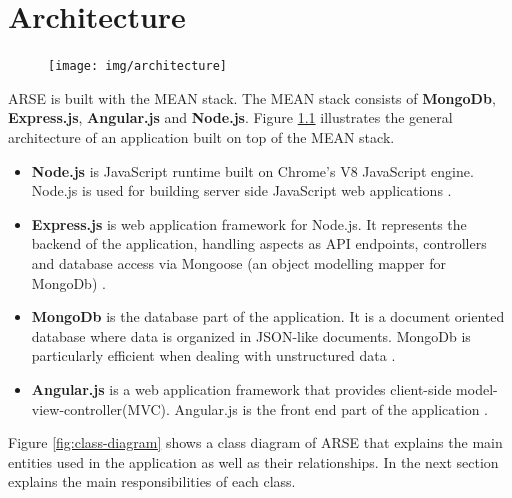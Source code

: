 \documentclass[
	accentcolor=tud1a %
]{tudreport}
\begin{document}
\chapter{Architecture}
\label{ch:architecture}

\begin{figure}
  \centering
    \texttt{[image: img/architecture]}
    \label{fig:architecture}
\end{figure}
ARSE is built with the MEAN stack. The MEAN stack consists of \textbf{MongoDb}, \textbf{Express.js}, \textbf{Angular.js} and \textbf{Node.js}. Figure \ref{fig:architecture} illustrates the general architecture of an application built on top of the MEAN stack.

\begin{itemize}
\item \textbf{Node.js} is JavaScript runtime built on Chrome's V8 JavaScript engine. Node.js is used for building server side JavaScript web applications \cite{NJS}.
\item \textbf{Express.js} is web application framework for Node.js. It represents the backend of the application, handling aspects as API endpoints, controllers and database access via Mongoose (an object modelling mapper for MongoDb) \cite{EXJS}.
\item \textbf{MongoDb} is the database part of the application. It is a document oriented database where data is organized in JSON-like documents. MongoDb is particularly efficient when dealing with unstructured data \cite{MDB}.
\item \textbf{Angular.js} is a web application framework that provides client-side model-view-controller(MVC). Angular.js is the front end part of the application \cite{AJS}.

\end{itemize}

Figure \ref{fig:class-diagram} shows a class diagram of ARSE that explains the main entities used in the application as well as their relationships. In the next section explains the main responsibilities of each class. 
\end{document}

